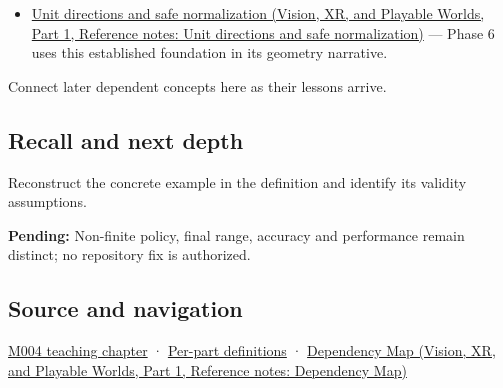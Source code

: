 \hypertarget{appendix-7f1e17dcafb1-used-by}{}

\begin{itemize}
\tightlist
\item
  \href{../07-Vision-XR-and-Playable-Worlds-P01/main.pdf\#appendix-f744e41b95b4}{Unit directions and safe normalization (Vision, XR, and Playable Worlds, Part 1, Reference notes: Unit directions and safe normalization)} --- Phase 6 uses this established foundation in its geometry narrative.
\end{itemize}

Connect later dependent concepts here as their lessons arrive.

\subsection{Recall and next depth}\label{appendix-7f1e17dcafb1-recall-and-next-depth}

\hypertarget{appendix-7f1e17dcafb1-recall-and-next-depth}{}

Reconstruct the concrete example in the definition and identify its validity assumptions.

\textbf{Pending:} Non-finite policy, final range, accuracy and performance remain distinct; no repository fix is authorized.

\subsection{Source and navigation}\label{appendix-7f1e17dcafb1-source-and-navigation}

\hypertarget{appendix-7f1e17dcafb1-source-and-navigation}{}

\hyperref[01-foundations-i-ch001-a-stretching-ruler-for-real-valued-quantities]{M004 teaching chapter} · \hyperref[appendix-fd090d982a15-m004---parts-61-76]{Per-part definitions} · \href{../07-Vision-XR-and-Playable-Worlds-P01/main.pdf\#appendix-4ad47bdd269a}{Dependency Map (Vision, XR, and Playable Worlds, Part 1, Reference notes: Dependency Map)}
